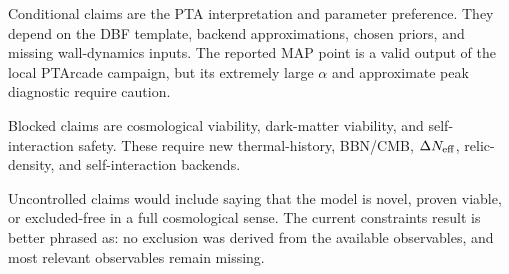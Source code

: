 \documentclass[11pt]{article}
\begin{document}
Conditional claims are the PTA interpretation and parameter preference. They depend on the DBF template, backend approximations, chosen priors, and missing wall-dynamics inputs. The reported MAP point is a valid output of the local PTArcade campaign, but its extremely large $\alpha$ and approximate peak diagnostic require caution.

Blocked claims are cosmological viability, dark-matter viability, and self-interaction safety. These require new thermal-history, BBN/CMB, $\Delta N_{\rm eff}$, relic-density, and self-interaction backends.

Uncontrolled claims would include saying that the model is novel, proven viable, or excluded-free in a full cosmological sense. The current constraints result is better phrased as: no exclusion was derived from the available observables, and most relevant observables remain missing.
\end{document}
